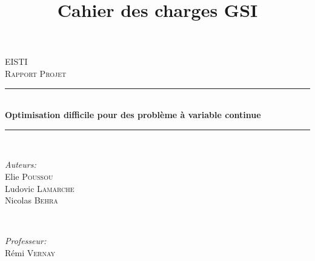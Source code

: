 \documentclass[12pt]{article}
\title{Cahier des charges GSI}
\begin{document}
\begin{titlepage}

\newcommand{\HRule}{\rule{\linewidth}{0.5mm}} %

\center %
 

\textsc{\LARGE EISTI}\\[1.2cm] %
\textsc{\Large Rapport Projet}\\[0.5cm] %


\HRule \\[0.4cm]
{ \huge \bfseries Optimisation difficile pour des problème à variable continue}\\[0.4cm] %
\HRule \\[1.5cm]
 

\begin{minipage}{0.4\textwidth}
\begin{flushleft} \large
\emph{Auteurs:}\\
Elie \textsc{Poussou} \\
Ludovic \textsc{Lamarche} \\
Nicolas \textsc{Behra} \\
\end{flushleft}
\end{minipage}
~
\begin{minipage}{0.4\textwidth}
\begin{flushright} \large
\emph{Professeur:} \\
Rémi \textsc{Vernay} %
\end{flushright}
\end{minipage}\\[2cm]


\end{titlepage}
\end{document}
